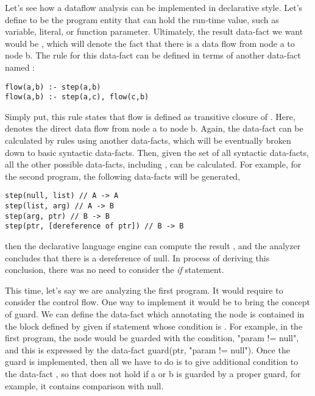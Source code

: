 Let's see how a dataflow analysis can be implemented in declarative style.
Let's define  to be the program entity that can hold the run-time
value, such as variable, literal, or function parameter.  Ultimately, the
result data-fact we want would be , which will denote the
fact that there is a data flow from node a to node b. The rule for this
data-fact can be defined in terms of another data-fact named :

\begin{lstlisting}[style=myDatalog,xleftmargin=2.5em]
flow(a,b) :- step(a,b)
flow(a,b) :- step(a,c), flow(c,b)
\end{lstlisting}

Simply put, this rule states that flow is defined as transitive closure of
.  Here,  denotes the direct data flow from node a to
node b. Again, the data-fact  can be calculated by rules using another
data-facts, which will be eventually broken down to basic syntactic data-facts.
Then, given the set of all syntactic data-facts, all the other possible
data-facts, including , can be calculated. For example, for the second
program, the following data-facts will be generated,

\begin{lstlisting}[style=myDatalog,xleftmargin=2.5em]
step(null, list) // A -> A
step(list, arg) // A -> B
step(arg, ptr) // B -> B
step(ptr, [dereference of ptr]) // B -> B
\end{lstlisting}

then the declarative language engine can compute the result , and the analyzer concludes that there is a dereference
of null. In process of deriving this conclusion, there was no need to consider
the \textit{if} statement.

This time, let's say we are analyzing the first program. It would require to
consider the control flow.  One way to implement it would be to bring the
concept of guard. We can define the data-fact  which
annotating the node is contained in the block defined by given if statement
whose condition is .  For example, in the first program, the
 node would be guarded with the condition, "param != null", and
this is expressed by the data-fact guard(ptr, "param != null").  Once the guard
is implemented, then all we have to do is to give additional condition to the
data-fact , so that  does not hold if a or b
is guarded by a proper guard, for example, it contains comparison with null.


